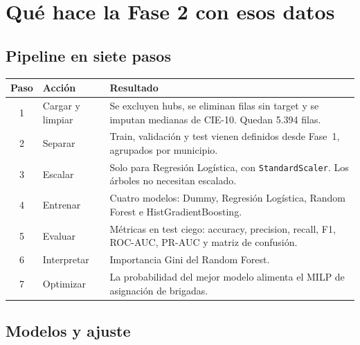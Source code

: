 \documentclass[11pt,a4paper]{article}
\newcommand{\code}[1]{\texttt{#1}}
\begin{document}
\section{Qué hace la Fase 2 con esos datos}

\subsection{Pipeline en siete pasos}

\begin{table}[H]
\centering
\small
\begin{tabularx}{\textwidth}{@{}c L{4.2cm} Y@{}}
\toprule
\textbf{Paso} & \textbf{Acción} & \textbf{Resultado} \\
 & Cargar y limpiar & Se excluyen hubs, se eliminan filas sin target y se imputan medianas de CIE-10. Quedan 5.394 filas. \\
2 & Separar & Train, validación y test vienen definidos desde Fase~1, agrupados por municipio. \\
3 & Escalar & Solo para Regresión Logística, con \code{StandardScaler}. Los árboles no necesitan escalado. \\
4 & Entrenar & Cuatro modelos: Dummy, Regresión Logística, Random Forest e HistGradientBoosting. \\
5 & Evaluar & Métricas en test ciego: accuracy, precision, recall, F1, ROC-AUC, PR-AUC y matriz de confusión. \\
6 & Interpretar & Importancia Gini del Random Forest. \\
7 & Optimizar & La probabilidad del mejor modelo alimenta el MILP de asignación de brigadas. \\
\bottomrule
\end{tabularx}
\end{table}

\subsection{Modelos y ajuste}
\end{document}
